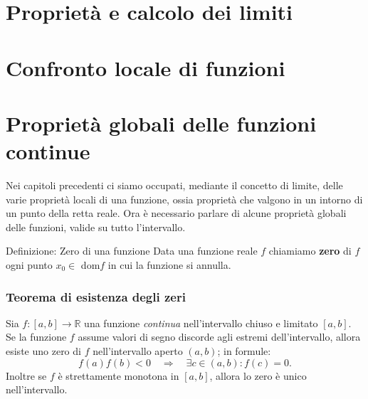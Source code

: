 \documentclass[x11names]{article}
\begin{document}
\newpage
\section{Proprietà e calcolo dei limiti}


\newpage
\section{Confronto locale di funzioni}


\newpage
\section{Proprietà globali delle funzioni continue}
Nei capitoli precedenti ci siamo occupati, mediante il concetto di limite, delle varie proprietà locali di una funzione, ossia proprietà che valgono in un intorno di un punto della retta reale. Ora è necessario parlare di alcune proprietà globali delle funzioni, valide su tutto l'intervallo.

\begin{center}
\colorbox{Azure2}{\begin{minipage}{5.75in}
\begin{blues}{Definizione: Zero di una funzione}
Data una funzione reale $f$ chiamiamo \textbf{zero} di $f$ ogni punto $x_0 \in$ dom$f$ in cui la funzione si annulla.
\end{blues}
\end{minipage}}        
\end{center}
\subsubsection{Teorema di esistenza degli zeri}
Sia $f:\left[a,b\right] \rightarrow \mathbb{R}$ una funzione \textit{continua} nell'intervallo chiuso e limitato $\left[a,b\right]$. Se la funzione $f$ assume valori di segno discorde agli estremi dell'intervallo, allora esiste uno zero  di $f$ nell'intervallo aperto $\left(a,b\right)$; in formule:
\[
	f\left(a\right)f\left(b\right) < 0 \quad \Rightarrow \quad \exists c \in \left(a,b\right) : f\left(c\right) = 0
.\] 
Inoltre se $f$ è strettamente monotona in $\left[a,b\right]$, allora lo zero è unico nell'intervallo.
\begin{center}

\end{center}
\end{document}
